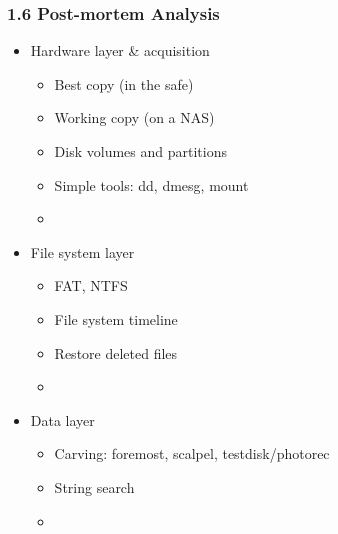\begin{frame}
  \frametitle{1.6 Post-mortem Analysis}
  \begin{itemize}
      \item Hardware layer \& acquisition
        \begin{itemize}
            \item[] Best copy (in the safe)
            \item[] Working copy (on a NAS)
            \item[] Disk volumes and partitions
            \item[] Simple tools: dd, dmesg, mount
            \item[]
        \end{itemize}
      \item File system layer
        \begin{itemize}
            \item[] FAT, NTFS
            \item[] File system timeline
            \item[] Restore deleted files
            \item[]
        \end{itemize}
      \item Data layer
        \begin{itemize}
            \item[] Carving: foremost, scalpel, testdisk/photorec
            \item[] String search
            \item[]
        \end{itemize}
  \end{itemize}
\end{frame}


